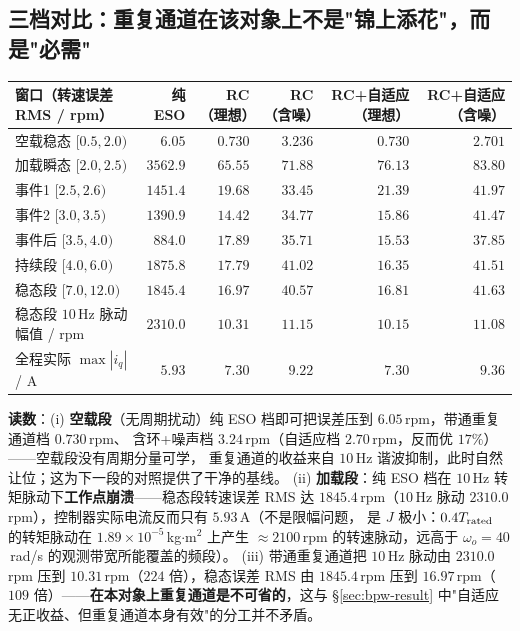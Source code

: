\documentclass[11pt]{article}
\theoremstyle{remark}\newtheorem{remark}{注}
\begin{document}
\subsection{三档对比：重复通道在该对象上不是"锦上添花"，而是"必需"}
\begin{center}
\footnotesize
\begin{tabular}{@{}lrrrrr@{}}
\toprule
窗口（转速误差 RMS / rpm） & 纯 ESO & RC（理想） & RC（含噪） & RC+自适应（理想） & RC+自适应（含噪）\\
\midrule
空载稳态 $[0.5,2.0)$ & $6.05$ & $0.730$ & $3.236$ & $0.730$ & $\mathbf{2.701}$\\
加载瞬态 $[2.0,2.5)$ & $3562.9$ & $65.55$ & $71.88$ & $76.13$ & $83.80$\\
事件1 $[2.5,2.6)$ & $1451.4$ & $19.68$ & $33.45$ & $21.39$ & $41.97$\\
事件2 $[3.0,3.5)$ & $1390.9$ & $14.42$ & $34.77$ & $15.86$ & $41.47$\\
事件后 $[3.5,4.0)$ & $884.0$ & $17.89$ & $35.71$ & $15.53$ & $37.85$\\
持续段 $[4.0,6.0)$ & $1875.8$ & $17.79$ & $41.02$ & $16.35$ & $41.51$\\
稳态段 $[7.0,12.0)$ & $1845.4$ & $16.97$ & $40.57$ & $16.81$ & $41.63$\\
\midrule
稳态段 $10$\,Hz 脉动幅值 / rpm & $2310.0$ & $10.31$ & $11.15$ & $10.15$ & $11.08$\\
全程实际 $\max|i_q|$ / A & $5.93$ & $7.30$ & $9.22$ & $7.30$ & $9.36$\\
\bottomrule
\end{tabular}
\end{center}
\noindent\textbf{读数}：(i) \textbf{空载段}（无周期扰动）纯 ESO 档即可把误差压到 $6.05$\,rpm，带通重复通道档 $0.730$\,rpm、
含环+噪声档 $3.24$\,rpm（自适应档 $2.70$\,rpm，反而优 $17\%$）——空载段没有周期分量可学，
重复通道的收益来自 $10$\,Hz 谐波抑制，此时自然让位；这为下一段的对照提供了干净的基线。
(ii) \textbf{加载段}：纯 ESO 档在 $10$\,Hz 转矩脉动下\textbf{工作点崩溃}——稳态段转速误差 RMS 达
$1845.4$\,rpm（$10$\,Hz 脉动 $2310.0$\,rpm），控制器实际电流反而只有 $5.93$\,A（不是限幅问题，
是 $J$ 极小：$0.4T_{\rm rated}$ 的转矩脉动在 $1.89\times10^{-5}$\,kg$\cdot$m$^2$ 上产生
$\approx 2100$\,rpm 的转速脉动，远高于 $\omega_o=40$\,rad/s 的观测带宽所能覆盖的频段）。
(iii) 带通重复通道把 $10$\,Hz 脉动由 $2310.0$\,rpm 压到 $10.31$\,rpm（$224$ 倍），稳态误差 RMS 由
$1845.4$\,rpm 压到 $16.97$\,rpm（$109$ 倍）——\textbf{在本对象上重复通道是不可省的}，这与 §\ref{sec:bpw-result}
中"自适应无正收益、但重复通道本身有效"的分工并不矛盾。
\end{document}
